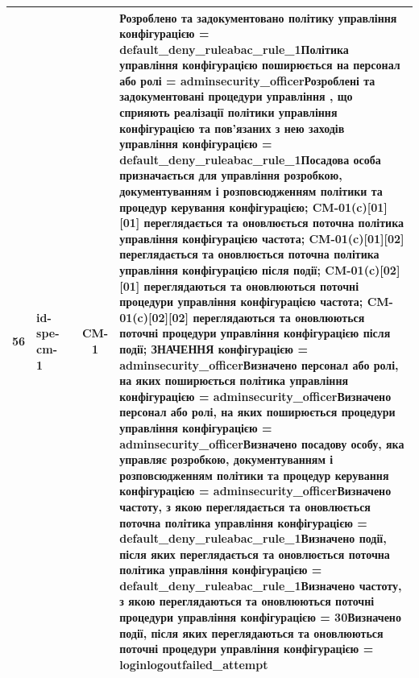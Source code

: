 \documentclass[10pt]{article}
\begin{document}
\begin{longtable}{|c|>{\raggedright\arraybackslash}p{2.5cm}|>{\raggedright\arraybackslash}p{4.5cm}|c|>{\raggedright\arraybackslash}p{4.5cm}|}
56 & id-spe-cm-1 &  & CM-1 & Розроблено та задокументовано політику управління конфігурацією = \textbf{default\_\allowbreak{}deny\_\allowbreak{}ruleabac\_\allowbreak{}rule\_\allowbreak{}1}\newline Політика управління конфігурацією поширюється на персонал або ролі = \textbf{adminsecurity\_\allowbreak{}officer}\newline Розроблені та задокументовані процедури управління , що сприяють реалізації політики управління конфігурацією та пов'язаних з нею заходів управління конфігурацією = \textbf{default\_\allowbreak{}deny\_\allowbreak{}ruleabac\_\allowbreak{}rule\_\allowbreak{}1}\newline Посадова особа призначається для управління розробкою, документуванням і розповсюдженням політики та процедур керування конфігурацією; CM-01(c)[01][01] переглядається та оновлюється поточна політика управління конфігурацією частота; CM-01(c)[01][02] переглядається та оновлюється поточна політика управління конфігурацією після події; CM-01(c)[02][01] переглядаються та оновлюються поточні процедури управління конфігурацією частота; CM-01(c)[02][02] переглядаються та оновлюються поточні процедури управління конфігурацією після події; ЗНАЧЕННЯ конфігурацією = \textbf{adminsecurity\_\allowbreak{}officer}\newline Визначено персонал або ролі, на яких поширюється політика управління конфігурацією = \textbf{adminsecurity\_\allowbreak{}officer}\newline Визначено персонал або ролі, на яких поширюється процедури управління конфігурацією = \textbf{adminsecurity\_\allowbreak{}officer}\newline Визначено посадову особу, яка управляє розробкою, документуванням і розповсюдженням політики та процедур керування конфігурацією = \textbf{adminsecurity\_\allowbreak{}officer}\newline Визначено частоту, з якою переглядається та оновлюється поточна політика управління конфігурацією = \textbf{default\_\allowbreak{}deny\_\allowbreak{}ruleabac\_\allowbreak{}rule\_\allowbreak{}1}\newline Визначено події, після яких переглядається та оновлюється поточна політика управління конфігурацією = \textbf{default\_\allowbreak{}deny\_\allowbreak{}ruleabac\_\allowbreak{}rule\_\allowbreak{}1}\newline Визначено частоту, з якою переглядаються та оновлюються поточні процедури управління конфігурацією = \textbf{30}\newline Визначено події, після яких переглядаються та оновлюються поточні процедури управління конфігурацією = \textbf{loginlogoutfailed\_\allowbreak{}attempt} \\ \hline

\end{longtable}
\end{document}
